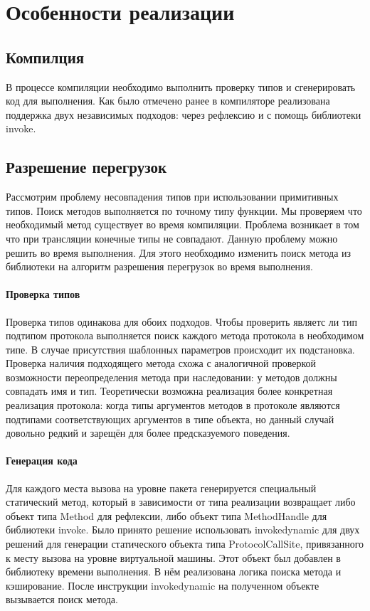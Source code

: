 \section{Особенности реализации}

\subsection{Компилция}
В процессе компиляции необходимо выполнить проверку типов и сгенерировать код для выполнения. Как было отмечено ранее в компиляторе реализована поддержка двух независимых подходов: через рефлексию и с помощь библиотеки invoke.

\subsection{Разрешение перегрузок}
Рассмотрим проблему несовпадения типов при использовании примитивных типов. Поиск методов выполняется по точному типу функции. Мы проверяем что необходимый метод существует во время компиляции. Проблема возникает в том что при трансляции конечные типы не совпадают. Данную проблему можно решить во время выполнения. Для этого необходимо изменить поиск метода из библиотеки на алгоритм разрешения перегрузок во время выполнения.

\paragraph{Проверка типов}
Проверка типов одинакова для обоих подходов. Чтобы проверить являетс ли тип подтипом протокола выполняется поиск каждого метода протокола в необходимом типе. В случае присутствия шаблонных параметров происходит их подстановка. Проверка наличия подходящего метода схожа с аналогичной проверкой возможности переопределения метода при наследовании: у методов должны совпадать имя и тип. Теоретически возможна реализация более конкретная реализация протокола: когда типы аргументов методов в протоколе являются подтипами соответствующих аргументов в типе объекта, но данный случай довольно редкий и зарещён для более предсказуемого поведения.

\paragraph{Генерация кода}
Для каждого места вызова на уровне пакета генерируется специальный статический метод, который в зависимости от типа реализации возвращает либо объект типа Method для рефлексии, либо объект типа MethodHandle для библиотеки invoke. Было принято решение использовать invokedynamic для двух решений для генерации статического объекта типа ProtocolCallSite, привязанного к месту вызова на уровне виртуальной машины. Этот объект был добавлен в библиотеку времени выполнения. В нём реализована логика поиска метода и кэширование. После инструкции invokedynamic на полученном объекте вызывается поиск метода.

